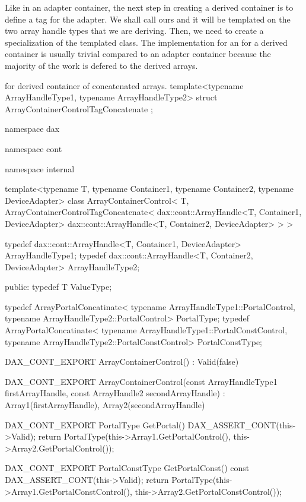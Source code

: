 Like in an adapter container, the next step in creating a derived container
is to define a tag for the adapter. We shall call ours
 and it will be templated on
the two array handle types that we are deriving. Then, we need to create a
specialization of the templated 
class. The implementation for an  for
a derived container is usually trivial compared to an adapter container
because the majority of the work is defered to the derived arrays.

\begin{daxexample}[ex:DerivedArrayContainer]{ for derived container of concatenated arrays.}
template<typename ArrayHandleType1, typename ArrayHandleType2>
struct ArrayContainerControlTagConcatenate {  };

namespace dax {
namespace cont {
namespace internal {

template<typename T, typename Container1, typename Container2, typename DeviceAdapter>
class ArrayContainerControl<
    T,
    ArrayContainerControlTagConcatenate<
        dax::cont::ArrayHandle<T, Container1, DeviceAdapter>
        dax::cont::ArrayHandle<T, Container2, DeviceAdapter> > >
{
  typedef dax::cont::ArrayHandle<T, Container1, DeviceAdapter> ArrayHandleType1;
  typedef dax::cont::ArrayHandle<T, Container2, DeviceAdapter> ArrayHandleType2;

public:
  typedef T ValueType;

  typedef ArrayPortalConcatinate<
      typename ArrayHandleType1::PortalControl,
      typename ArrayHandleType2::PortalControl> PortalType;
  typedef ArrayPortalConcatinate<
      typename ArrayHandleType1::PortalConstControl,
      typename ArrayHandleType2::PortalConstControl> PortalConstType;

  DAX_CONT_EXPORT
  ArrayContainerControl() : Valid(false) {  }

  DAX_CONT_EXPORT
  ArrayContainerControl(const ArrayHandleType1 firstArrayHandle,
                        const ArrayHandle2 secondArrayHandle)
    : Array1(firstArrayHandle), Array2(secondArrayHandle) {  }

  DAX_CONT_EXPORT
  PortalType GetPortal() {
    DAX_ASSERT_CONT(this->Valid);
    return PortalType(this->Array1.GetPortalControl(), this->Array2.GetPortalControl());
  }

  DAX_CONT_EXPORT
  PortalConstType GetPortalConst() const {
    DAX_ASSERT_CONT(this->Valid);
    return PortalType(this->Array1.GetPortalConstControl(),
                      this->Array2.GetPortalConstControl());
  }

}}}}
\end{daxexample}
